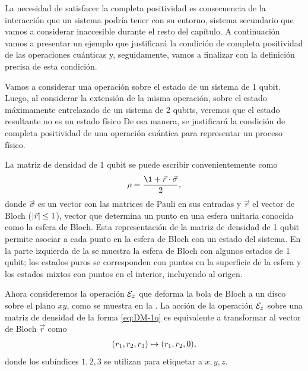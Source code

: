 La necesidad de satisfacer la completa positividad
es consecuencia de la interacción que un sistema podría tener
con su entorno, sistema secundario que vamos 
a considerar inaccesible durante el resto del capítulo.
A continuación vamos a presentar un ejemplo que justificará la condición
de completa positividad de las operaciones cuánticas y, seguidamente,
vamos a finalizar con la definición precisa de esta condición.

Vamos a considerar una operación sobre el estado de un sistema de 
1 qubit. Luego, al considerar la extensión de la misma operación,
sobre el estado máximamente entrelazado de un sistema de 2 qubits, 
veremos que el estado resultante no es un estado físico
De esa manera, se justificará la condición de completa positividad 
de una operación cuántica para representar un proceso físico.

La matriz de densidad de 1 qubit se puede escribir convenientemente
como \cite{nielsen_chuang_2011}
\begin{align}
\rho=\frac{\1+\vec{r}\cdot\vec{\sigma}}{2},
\label{eq:DM-1q}
\end{align}
donde $\vec{\sigma}$ es un vector con las matrices de Pauli 
en sus entradas y $\vec{r}$
el vector de Bloch ($\abs{\vec{r}}\leq1$), vector que determina
un punto en una esfera unitaria conocida como la esfera de Bloch. 
Esta representación de la matriz de densidad de 1 qubit 
permite asociar a cada punto en la 
esfera de Bloch con un estado del sistema. En la parte
izquierda de la  se muestra la esfera de Bloch
con algunos estados de 1 qubit; los estados puros se corresponden
con puntos en la superficie de la esfera y los estados mixtos 
con puntos en el interior, incluyendo al origen.

Ahora consideremos la operación $\mathcal{E}_z$ que deforma la bola de Bloch a un 
disco sobre el plano $xy$, como se muestra en la . 
La acción de la operación $\mathcal{E}_z$ sobre una matriz de densidad
de la forma \eqref{eq:DM-1q} es equivalente a 
transformar al vector de Bloch $\vec{r}$ como 
\begin{align}
\qty(r_1,r_2,r_3)\mapsto\qty(r_1,r_2,0),
\label{eq:notCP}
\end{align}
donde los subíndices $1,2,3$ se utilizan para etiquetar a $x,y,z$.

